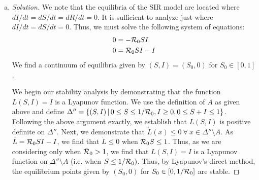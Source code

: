 \documentclass[12pt]{article}
\begin{document}
\begin{enumerate}[(a)]
{\begin{proof}[Answers]
Next, we show that $\dot{L}(x) < 0 \ \forall \ x \in \Delta' \setminus A$. First, let us find an expression for $\dot{L}(x)$. 
\begin{equation*}
\begin{aligned}
\dot{L}=\frac{d}{dt}L(S,I) &= \frac{dL}{dI} \frac{dI}{dt}+ \frac{dL}{dS}\frac{dS}{dt}\\
\dot{L}&= \R_0 SI - I
\end{aligned}
\end{equation*}
Thus, $\dot{L} < 0$ if $\R_0 S < 1$. We note that $\R_0 >1$ in biologically relevant contexts - as this means that the disease is capable of causing an epidemic. Thus, $\R_0 S<1$ when $S< \frac{1}{\R_0}$. Therefore, the function $L(S,I)=I$ is a strict Lyapunov function on $\Delta' \setminus A$ (i.e. when $S< \frac{1}{\R_0}$), and we conclude that $I = 0$ is globally asymptotically stable.
\end{proof}
}

\item \basicSIRanalQd

{\color{blue}
\begin{proof}[Solution]
We note that the equilibria of the SIR model are located where $dI/dt=dS/dt=dR/dt=0$. It is sufficient to analyze just where $dI/dt=dS/dt=0$. Thus, we must solve the following system of equations:
\begin{equation*}
\begin{aligned}
0&=-{\cal R}_0 SI\\
0&= {\cal R}_0 SI - I
\end{aligned}
\end{equation*}
We find a continuum of equilibria given by $(S,I)=(S_0,0)$ for $S_0 \in [0,1]$.

We begin our stability analysis by demonstrating that the function $L(S,I)=I$ is a Lyapunov function. We use the definition of $A$ as given above and define $\Delta'' = \{ (S, I) \, | \, 0 \leq S \leq 1/{\cal R}_0, I \geq 0, 0 \leq S+I \leq 1 \}$. Following the above argument exactly, we establish that $L(S,I)$ is positive definite on $\Delta''$. Next, we demonstrate that $\dot{L}(x) \leq 0 \ \forall \ x \in \Delta'' \setminus A$. As $\dot{L}={\cal R}_0 S I -I$, we find that $\dot{L} \leq 0$ when ${\cal R}_0S \leq 1$. Thus, as we are considering only when $\R_0>1$, we find that $L(S,I)=I$ is a Lyapunov function on $\Delta'' \setminus A$ (i.e. when $S \leq 1/{\cal R}_0)$. Thus, by Lyapunov's direct method, the equilibrium points given by $(S_0, 0)$ for $S_0 \in [0, 1/{\cal R}_0]$ are stable. 


\end{proof}}
\end{enumerate}
\end{document}
